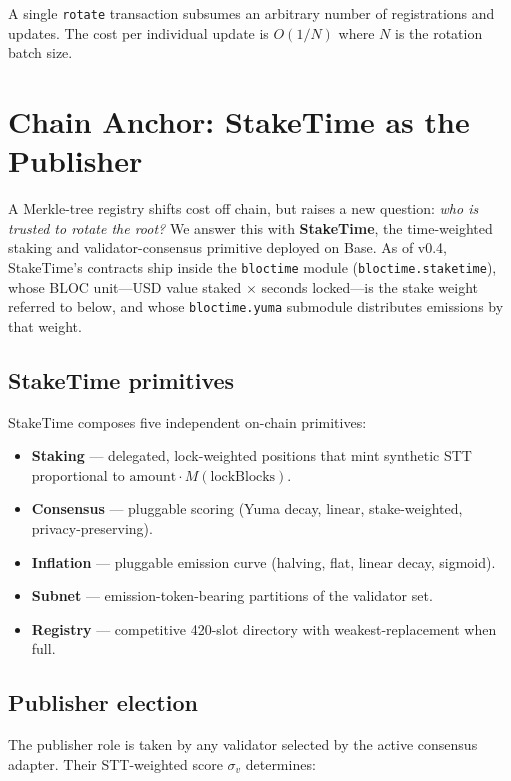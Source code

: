 \documentclass[11pt,a4paper]{article}
\begin{document}
A single \texttt{rotate} transaction subsumes an arbitrary number of registrations and updates. The cost per individual update is $O(1/N)$ where $N$ is the rotation batch size.

\section{Chain Anchor: StakeTime as the Publisher}
\label{sec:chain}

A Merkle-tree registry shifts cost off chain, but raises a new question: \emph{who is trusted to rotate the root?} We answer this with \textbf{StakeTime}, the time-weighted staking and validator-consensus primitive deployed on Base. As of v0.4, StakeTime's contracts ship inside the \texttt{bloctime} module (\texttt{bloctime.staketime}), whose BLOC unit---USD value staked $\times$ seconds locked---is the stake weight referred to below, and whose \texttt{bloctime.yuma} submodule distributes emissions by that weight.

\subsection{StakeTime primitives}

StakeTime composes five independent on-chain primitives:

\begin{itemize}
    \item \textbf{Staking} --- delegated, lock-weighted positions that mint synthetic STT proportional to $\text{amount} \cdot M(\text{lockBlocks})$.
    \item \textbf{Consensus} --- pluggable scoring (Yuma decay, linear, stake-weighted, privacy-preserving).
    \item \textbf{Inflation} --- pluggable emission curve (halving, flat, linear decay, sigmoid).
    \item \textbf{Subnet} --- emission-token-bearing partitions of the validator set.
    \item \textbf{Registry} --- competitive 420-slot directory with weakest-replacement when full.
\end{itemize}

\subsection{Publisher election}

The publisher role is taken by any validator selected by the active consensus adapter. Their STT-weighted score $\sigma_v$ determines:
\end{document}
